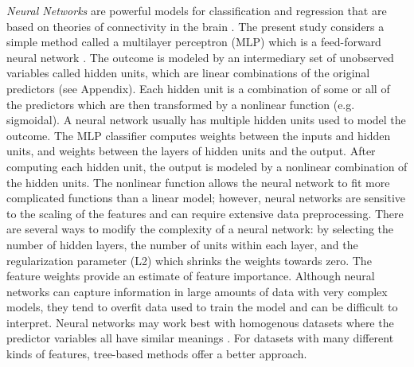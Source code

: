 \emph{Neural Networks} are powerful models for classification and regression 
that are based on theories of connectivity in the brain \cite{kuhn13}. 
The present study considers a simple method called a multilayer perceptron 
(MLP) which is a feed-forward neural network \cite{muller17, raschka17}. 
The outcome is modeled by an intermediary set of unobserved variables called 
hidden units, which are linear combinations of the original predictors
(see Appendix). Each hidden unit is a combination of some or all of the 
predictors which are then transformed by a nonlinear function (e.g. 
sigmoidal). A neural network usually has multiple hidden units used 
to model the outcome. The MLP classifier computes weights between the inputs 
and hidden units, and weights between the layers of hidden units and the 
output. After computing each hidden unit, the output is modeled by a nonlinear 
combination of the hidden units. The nonlinear function allows the neural 
network to fit more complicated functions than a linear model; however, 
neural networks are sensitive to the scaling of the features and can require
extensive data preprocessing. There are several ways to modify the complexity 
of a neural network: by selecting the number of hidden layers, the number of 
units within each layer, and the regularization parameter (L2) which shrinks 
the weights towards zero. The feature weights provide an estimate of feature 
importance. Although neural networks can capture information in large amounts 
of data with very complex models, they tend to overfit data used to train the 
model and can be difficult to interpret. Neural networks may work best with 
homogenous datasets where the predictor variables all have similar meanings 
\cite{muhuri13}. For datasets with many different kinds of features, 
tree-based methods offer a better approach.


